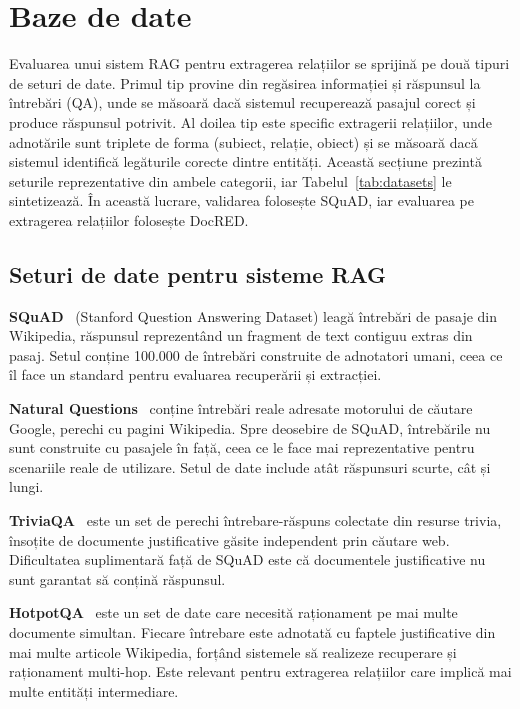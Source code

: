 \section{Baze de date}

Evaluarea unui sistem RAG pentru extragerea relațiilor se sprijină pe două tipuri de seturi de date. Primul tip provine din regăsirea informației și răspunsul la întrebări (QA), unde se măsoară dacă sistemul recuperează pasajul corect și produce răspunsul potrivit. Al doilea tip este specific extragerii relațiilor, unde adnotările sunt triplete de forma (subiect, relație, obiect) și se măsoară dacă sistemul identifică legăturile corecte dintre entități. Această secțiune prezintă seturile reprezentative din ambele categorii, iar Tabelul~\ref{tab:datasets} le sintetizează. În această lucrare, validarea folosește SQuAD, iar evaluarea pe extragerea relațiilor folosește DocRED.

\subsection{Seturi de date pentru sisteme RAG}

\textbf{SQuAD}~\cite{rajpurkar-etal-2016-squad} (Stanford Question Answering Dataset) leagă întrebări de pasaje din Wikipedia, răspunsul reprezentând un fragment de text contiguu extras din pasaj. Setul conține 100.000 de întrebări construite de adnotatori umani, ceea ce îl face un standard pentru evaluarea recuperării și extracției.

\textbf{Natural Questions}~\cite{kwiatkowski2019nq} conține întrebări reale adresate motorului de căutare Google, perechi cu pagini Wikipedia. Spre deosebire de SQuAD, întrebările nu sunt construite cu pasajele în față, ceea ce le face mai reprezentative pentru scenariile reale de utilizare. Setul de date include atât răspunsuri scurte, cât și lungi.

\textbf{TriviaQA}~\cite{joshi2017triviaqa} este un set de perechi întrebare-răspuns colectate din resurse trivia, însoțite de documente justificative găsite independent prin căutare web. Dificultatea suplimentară față de SQuAD este că documentele justificative nu sunt garantat să conțină răspunsul.

\textbf{HotpotQA}~\cite{yang2018hotpotqa} este un set de date care necesită raționament pe mai multe documente simultan. Fiecare întrebare este adnotată cu faptele justificative din mai multe articole Wikipedia, forțând sistemele să realizeze recuperare și raționament multi-hop. Este relevant pentru extragerea relațiilor care implică mai multe entități intermediare.

